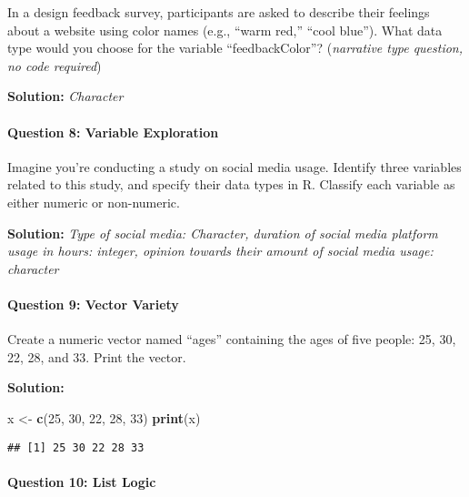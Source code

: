 \documentclass[
]{article}
\newenvironment{Shaded}{\begin{snugshade}}{\end{snugshade}}
\newcommand{\DecValTok}[1]{\textcolor[rgb]{0.00,0.00,0.81}{#1}}
\newcommand{\FunctionTok}[1]{\textcolor[rgb]{0.13,0.29,0.53}{\textbf{#1}}}
\newcommand{\NormalTok}[1]{#1}
\newcommand{\OtherTok}[1]{\textcolor[rgb]{0.56,0.35,0.01}{#1}}
\begin{document}
In a design feedback survey, participants are asked to describe their
feelings about a website using color names (e.g., ``warm red,'' ``cool
blue''). What data type would you choose for the variable
``feedbackColor''? (\emph{narrative type question, no code required})

\textbf{Solution:} \emph{Character}

\hypertarget{question-8-variable-exploration}{%
\paragraph{Question 8: Variable
Exploration}\label{question-8-variable-exploration}}

Imagine you're conducting a study on social media usage. Identify three
variables related to this study, and specify their data types in R.
Classify each variable as either numeric or non-numeric.

\textbf{Solution:} \emph{Type of social media: Character, duration of
social media platform usage in hours: integer, opinion towards their
amount of social media usage: character}

\hypertarget{question-9-vector-variety}{%
\paragraph{Question 9: Vector Variety}\label{question-9-vector-variety}}

Create a numeric vector named ``ages'' containing the ages of five
people: 25, 30, 22, 28, and 33. Print the vector.

\textbf{Solution:}

\begin{Shaded}
\begin{Highlighting}[]
\NormalTok{x }\OtherTok{\textless{}{-}} \FunctionTok{c}\NormalTok{(}\DecValTok{25}\NormalTok{, }\DecValTok{30}\NormalTok{, }\DecValTok{22}\NormalTok{, }\DecValTok{28}\NormalTok{, }\DecValTok{33}\NormalTok{)}
\FunctionTok{print}\NormalTok{(x)}
\end{Highlighting}
\end{Shaded}

\begin{verbatim}
## [1] 25 30 22 28 33
\end{verbatim}

\hypertarget{question-10-list-logic}{%
\paragraph{Question 10: List Logic}\label{question-10-list-logic}}
\end{document}
